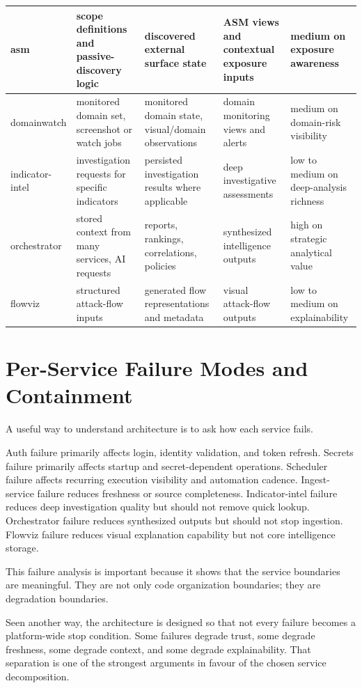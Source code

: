 \begin{table}[H]
\begin{tabular}{|p{2.4cm}|p{3.0cm}|p{3.0cm}|p{2.9cm}|p{2.1cm}|}
\hline
asm & scope definitions and passive-discovery logic & discovered external surface state & ASM views and contextual exposure inputs & medium on exposure awareness\\
\hline
domainwatch & monitored domain set, screenshot or watch jobs & monitored domain state, visual/domain observations & domain monitoring views and alerts & medium on domain-risk visibility\\
\hline
indicator-intel & investigation requests for specific indicators & persisted investigation results where applicable & deep investigative assessments & low to medium on deep-analysis richness\\
\hline
orchestrator & stored context from many services, AI requests & reports, rankings, correlations, policies & synthesized intelligence outputs & high on strategic analytical value\\
\hline
flowviz & structured attack-flow inputs & generated flow representations and metadata & visual attack-flow outputs & low to medium on explainability\\
\hline
\end{tabular}
\end{table}

\section{Per-Service Failure Modes and Containment}
A useful way to understand architecture is to ask how each service fails.

Auth failure primarily affects login, identity validation, and token refresh. Secrets failure primarily affects startup and secret-dependent operations. Scheduler failure affects recurring execution visibility and automation cadence. Ingest-service failure reduces freshness or source completeness. Indicator-intel failure reduces deep investigation quality but should not remove quick lookup. Orchestrator failure reduces synthesized outputs but should not stop ingestion. Flowviz failure reduces visual explanation capability but not core intelligence storage.

This failure analysis is important because it shows that the service boundaries are meaningful. They are not only code organization boundaries; they are degradation boundaries.

Seen another way, the architecture is designed so that not every failure becomes a platform-wide stop condition. Some failures degrade trust, some degrade freshness, some degrade context, and some degrade explainability. That separation is one of the strongest arguments in favour of the chosen service decomposition.

